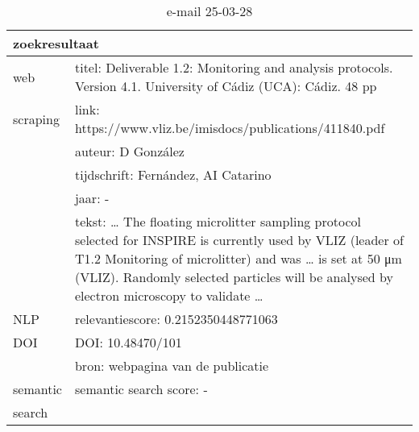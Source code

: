 \begin{table}[h!]
    \caption{e-mail 25-03-28}
    \centering
    \begin{tabularx}{\textwidth}{|p{4cm}|X|} 
        \hline
        \multicolumn{2}{|X|}{\textbf{zoekresultaat}} \\
        \hline
        web &titel: Deliverable 1.2: Monitoring and analysis protocols. Version 4.1. University of Cádiz (UCA): Cádiz. 48 pp\\
        scraping&link: https://www.vliz.be/imisdocs/publications/411840.pdf\\
        &auteur: D González\\
        &tijdschrift: Fernández, AI Catarino\\
        &jaar: -\\
        &tekst: … The floating microlitter sampling protocol selected for INSPIRE is currently used by VLIZ (leader of T1.2 Monitoring of microlitter) and was … is set at 50 μm (VLIZ). Randomly selected particles will be analysed by electron microscopy to validate …\\
        \hline
        NLP&relevantiescore: 0.2152350448771063\\
        \hline
        DOI&DOI: 10.48470/101\\
        &bron: webpagina van de publicatie\\
        \hline
        semantic&semantic search score: -\\
        search&\\
        \hline
    \end{tabularx}
    \label{table:email20250328}
\end{table}
